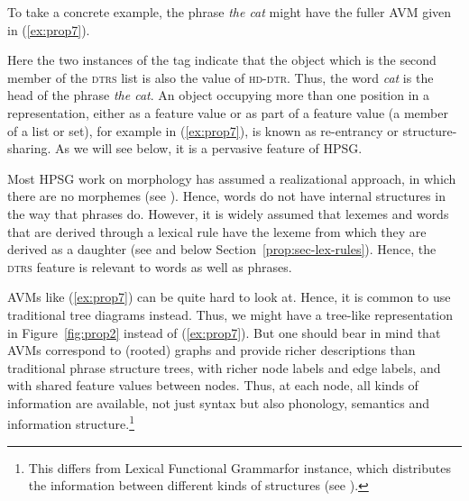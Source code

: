 \documentclass[output=paper
	        ,collection
	        ,collectionchapter
 	        ,biblatex
                ,babelshorthands
                ,newtxmath
                ,draftmode
                ,colorlinks, citecolor=brown
]{langscibook}
\begin{document}
\begin{multicols}{2}
\eal\label{ex:prop6}
\ex\label{ex:prop6a}

\columnbreak
\ex\label{ex:prop6b}
\zl
\end{multicols}
%
To take a concrete example, the phrase \emph{the cat} might have the fuller AVM given in (\ref{ex:prop7}).

\ea\label{ex:prop7}
\z

\noindent
Here the two instances of the tag  indicate that the  object which is the second member of the \textsc{dtrs} list is also the value of \textsc{hd-dtr}. Thus, the word \emph{cat} is the head of the phrase \emph{the cat}. An object occupying more than one position in a representation, either as a feature value or as part of a feature value (a member of a list or set), for example  in (\ref{ex:prop7}), is known as re-entrancy or structure-sharing. As we will see below, it is a pervasive feature of HPSG.

Most HPSG work on morphology has assumed a realizational approach, in which there are no morphemes (see ). Hence, words do not have internal structures in the way that phrases do. However, it is widely assumed that lexemes and words that are derived through a lexical rule have the lexeme from which they are derived as a daughter (see  and below Section~\ref{prop:sec-lex-rules}). Hence, the \textsc{dtrs} feature is relevant to words as well as phrases.

AVMs like (\ref{ex:prop7}) can be quite hard to look at. Hence, it is common to use traditional tree
diagrams instead. Thus, we might have a tree-like representation in Figure~\ref{fig:prop2} instead
of (\ref{ex:prop7}). But one should bear in mind that AVMs correspond to (rooted) graphs and provide
richer descriptions than traditional phrase structure trees, with richer node labels and edge
labels, and with shared feature values between nodes. Thus, at each node, all kinds of information
are available, not just syntax but also phonology, semantics and information structure.\footnote{%
 This differs from Lexical Functional Grammar\indexlfg for instance, which distributes the
 information between different kinds of structures (see ).}
%
\end{document}
